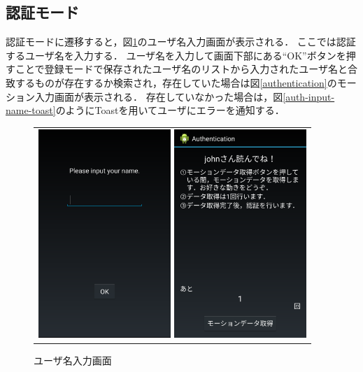 \subsection{認証モード}
認証モードに遷移すると，図\ref{auth-input-name}のユーザ名入力画面が表示される．
ここでは認証するユーザ名を入力する．
ユーザ名を入力して画面下部にある``OK''ボタンを押すことで登録モードで保存されたユーザ名のリストから入力されたユーザ名と合致するものが存在するか検索され，存在していた場合は図\ref{authentication}のモーション入力画面が表示される．
存在していなかった場合は，図\ref{auth-input-name-toast}のようにToastを用いてユーザにエラーを通知する．

\begin{figure}[hbtp]
  \centering
  \begin{tabular}{c}
    \begin{minipage}{0.33\hsize}
      \centering
      \includegraphics[bb=0 0 1080 1705, width=5cm]{Screenshots/auth-input-name.pdf}
      \caption{ユーザ名入力画面}
      \label{auth-input-name}
    \end{minipage}
    \begin{minipage}{0.33\hsize}
      \centering
      \includegraphics[bb=0 0 1080 1705, width=5cm]{Screenshots/authentication.pdf}

\end{minipage}
\end{tabular}
\end{figure}
